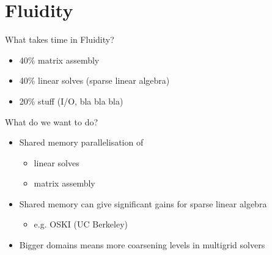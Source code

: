 \documentclass[bigger]{beamer}
\begin{document}
\section{Fluidity}
\label{sec:orgheadline17}
\begin{frame}[label={sec:orgheadline15}]{What takes time in Fluidity?}
\begin{itemize}
\item 40\% matrix assembly
\item 40\% linear solves (sparse linear algebra)
\item 20\% stuff (I/O, bla bla bla)
\end{itemize}
\end{frame}

\begin{frame}[label={sec:orgheadline16}]{What do we want to do?}
\begin{itemize}
\item Shared memory parallelisation of
\begin{itemize}
\item linear solves
\item matrix assembly
\end{itemize}
\item Shared memory can give significant gains for sparse linear algebra
\begin{itemize}
\item e.g. OSKI (UC Berkeley)
\end{itemize}
\item Bigger domains means more coarsening levels in multigrid solvers
\end{itemize}
\end{frame}
\end{document}
